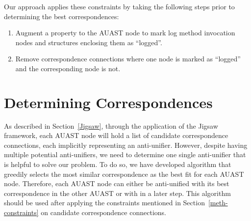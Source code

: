 Our approach applies these constraints by taking the following steps prior to determining the best correspondences:
\begin{enumerate} [leftmargin=.4in]
\item	Augment a property to the AUAST node to mark log method invocation nodes and structures enclosing them as ``logged''.

\item	Remove correspondence connections where one node is marked as ``logged'' and the corresponding node is not.
\end{enumerate}


\section{Determining Correspondences} \label{meth-correspondence}
As described in Section~\ref{Jigsaw}, through the application of the Jigsaw framework, each AUAST node will hold a list of candidate correspondence connections, each implicitly representing an anti-unifier. However, despite having multiple potential anti-unifiers, we need to determine one single anti-unifier that is helpful to solve our problem. To do so, we have developed  algorithm that greedily selects the most similar correspondence as the best fit for each AUAST node. Therefore, each AUAST node can either be anti-unified with its best correspondence in the other AUAST or with \nothing in a later step. This algorithm should be used after applying the constraints mentioned in Section~\ref{meth-constraints} on candidate correspondence connections. 


